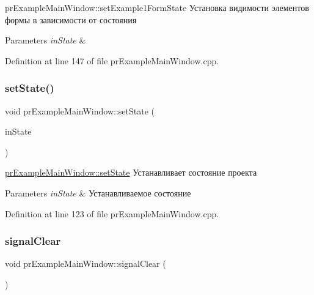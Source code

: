 pr\+Example\+Main\+Window\+::set\+Example1\+Form\+State Установка видимости элементов формы в зависимости от состояния 


\begin{DoxyParams}{Parameters}
{\em in\+State} & \\
\hline
\end{DoxyParams}


Definition at line 147 of file pr\+Example\+Main\+Window.\+cpp.

\mbox{\label{classpr_example_main_window_a81e478c0b0696290226327898a62b53a}} 
\subsubsection{\texorpdfstring{set\+State()}{setState()}}
{\footnotesize\ttfamily void pr\+Example\+Main\+Window\+::set\+State (\begin{DoxyParamCaption}\item[{\hyperlink{classpr_example_main_window_ac6ea07691b05604b1dda8ec6263c028c}{pr\+Example\+Main\+Window\+::pr\+State}}]{in\+State }\end{DoxyParamCaption})\hspace{0.3cm}{\ttfamily [private]}}



\hyperlink{classpr_example_main_window_a81e478c0b0696290226327898a62b53a}{pr\+Example\+Main\+Window\+::set\+State} Устанавливает состояние проекта 


\begin{DoxyParams}{Parameters}
{\em in\+State} & Устанавливаемое состояние \\
\hline
\end{DoxyParams}


Definition at line 123 of file pr\+Example\+Main\+Window.\+cpp.

\mbox{\label{classpr_example_main_window_a46ef47aff2d6b2b511b24ceada6bbb20}} 
\subsubsection{\texorpdfstring{signal\+Clear}{signalClear}}
{\footnotesize\ttfamily void pr\+Example\+Main\+Window\+::signal\+Clear (\begin{DoxyParamCaption}{ }\end{DoxyParamCaption})\hspace{0.3cm}{\ttfamily [signal]}}

